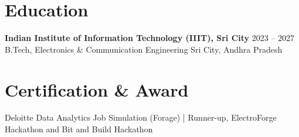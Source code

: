\documentclass[10pt,a4paper]{article}
\begin{document}
\section*{Education}
\textbf{Indian Institute of Information Technology (IIIT), Sri City} \hfill 2023 -- 2027\\
B.Tech, Electronics \& Communication Engineering \hfill Sri City, Andhra Pradesh
\section*{Certification \& Award}
Deloitte Data Analytics Job Simulation (Forage) \;|\; Runner-up, ElectroForge Hackathon and Bit and Build Hackathon
\end{document}
